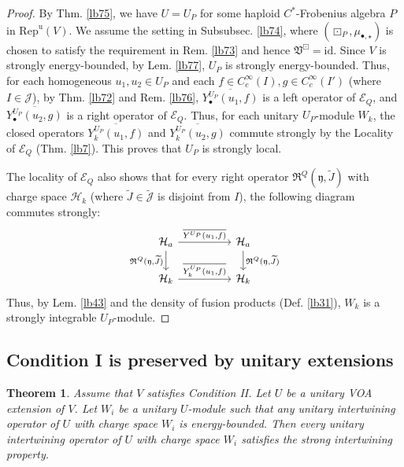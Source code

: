 \documentclass[11pt,b5paper,notitlepage]{article}
\theoremstyle{definition}
\theoremstyle{plain}
\newtheorem{thm}[df]{Theorem}
\newcommand{\fk}{\mathfrak}
\newcommand{\mc}{\mathcal}
\newcommand{\wtd}{\widetilde}
\newcommand{\ovl}{\overline}
\newcommand{\id}{\mathrm{id}}
\newcommand{\uni}{\mathrm{u}}
\newcommand{\scr}{\mathscr}
\newcommand{\Jtd}{\widetilde{\mathcal J}}
\newcommand{\yk}{\mathfrak y}
\newcommand{\RepV}{{\mathrm{Rep}^\uni(V)}}
\newcommand{\blt}{\bullet}
\numberwithin{equation}{section}
\begin{document}
\begin{proof}
By Thm. \ref{lb75}, we have $U=U_P$ for some haploid $C^*$-Frobenius algebra $P$ in $\RepV$. We assume the setting in Subsubsec. \ref{lb74}, where $(\boxdot_P,\mu_{\blt,\star})$ is chosen to satisfy the requirement in Rem. \ref{lb73} and hence $\fk V^\boxdot=\id$. Since $V$ is strongly energy-bounded, by Lem. \ref{lb77}, $U_P$ is strongly energy-bounded. Thus, for each homogeneous $u_1,u_2\in U_P$ and each $f\in C_c^\infty(I),g\in C_c^\infty(I')$ (where $I\in\mc J$), by Thm. \ref{lb72} and Rem. \ref{lb76}, $\ovl{Y^{U_P}_\blt(u_1,f)}$ is a left operator of $\scr E_Q$, and $\ovl{Y^{U_P}_\blt(u_2,g)}$ is a right operator of $\scr E_Q$. Thus, for each unitary $U_P$-module $W_k$, the closed operators $\ovl{Y^{U_P}_k(u_1,f)}$ and $\ovl{Y^{U_P}_k(u_2,g)}$ commute strongly by the Locality of $\scr E_Q$ (Thm. \ref{lb7}). This proves that $U_P$ is strongly local. 

The locality of $\scr E_Q$ also shows that for every right operator $\fk R^Q(\yk,\wtd J)$ with charge space $\mc H_k$ (where $\wtd J\in\Jtd$ is disjoint from $I$), the following diagram commutes strongly:
\begin{equation*}
\begin{tikzcd}[column sep=huge]
\mc H_a \arrow[d,"{\fk R^Q(\yk,\wtd J)}"'] \arrow[r,"{\ovl{Y^{U_P}(u_1,f)}}"] & \mc H_a \arrow[d,"{\fk R^Q(\yk,\wtd J)}"] \\
\mc H_k \arrow[r,"{\ovl{Y_k^{U_P}(u_1,f)}}"]           & \mc H_k        
\end{tikzcd}
\end{equation*}
Thus, by Lem. \ref{lb43} and the density of fusion products (Def. \ref{lb31}), $W_k$ is a strongly integrable $U_P$-module.
\end{proof}


\subsection{Condition I is preserved by unitary extensions}



\begin{thm}\label{lb80}
Assume that $V$ satisfies Condition II. Let $U$ be a unitary VOA extension of $V$. Let $W_i$ be a unitary $U$-module such that any unitary intertwining operator of $U$ with charge space $W_i$ is energy-bounded. Then every unitary intertwining operator of $U$ with charge space $W_i$ satisfies the strong intertwining property.
\end{thm}
\end{document}
